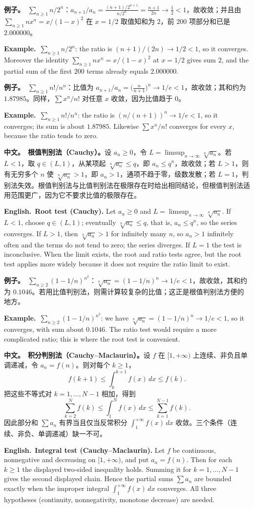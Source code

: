 \documentclass[UTF8,11pt,a4paper]{ctexart}
\newcommand{\BOTH}[2]{\par\noindent\textbf{中文。}\ #1\par\noindent\textbf{English.}\ #2\par}
\newcommand{\EX}[2]{\par\noindent\textbf{例子。}\ #1\par\noindent\textbf{Example.}\ #2\par}
\begin{document}
\EX{$\sum_{n\ge1}n/2^n$：$a_{n+1}/a_n=\frac{(n+1)/2^{n+1}}{n/2^n}=\frac{n+1}{2n}\to\frac12<1$，故收敛；并且由 $\sum_{n\ge1}nx^n=x/(1-x)^2$ 在 $x=1/2$ 取值知和为 $2$，前 $200$ 项部分和已是 $2.000000$。}{$\sum_{n\ge1}n/2^n$: the ratio is $(n+1)/(2n)\to1/2<1$, so it converges. Moreover the identity $\sum_{n\ge1}nx^n=x/(1-x)^2$ at $x=1/2$ gives sum $2$, and the partial sum of the first $200$ terms already equals $2.000000$.}
\EX{$\sum_{n\ge1}n!/n^n$：比值为 $a_{n+1}/a_n=\bigl(\frac{n}{n+1}\bigr)^n\to1/e<1$，故收敛；其和约为 $1.87985$。同样，$\sum x^n/n!$ 对任意 $x$ 收敛，因为比值趋于 $0$。}{$\sum_{n\ge1}n!/n^n$: the ratio is $(n/(n+1))^n\to1/e<1$, so it converges; its sum is about $1.87985$. Likewise $\sum x^n/n!$ converges for every $x$, because the ratio tends to zero.}
\BOTH{\textbf{根值判别法（Cauchy）。}设 $a_n\ge0$，令 $L=\limsup_{n\to\infty}\sqrt[n]{a_n}$。若 $L<1$，取 $q\in(L,1)$，从某项起 $\sqrt[n]{a_n}\le q$，即 $a_n\le q^n$，故收敛；若 $L>1$，则有无穷多个 $n$ 使 $\sqrt[n]{a_n}>1$，即 $a_n>1$，通项不趋于零，级数发散；若 $L=1$，判别法失效。根值判别法与比值判别法在极限存在时给出相同结论，但根值判别法适用范围更广，因为它不要求比值的极限存在。}{\textbf{Root test (Cauchy).} Let $a_n\ge0$ and $L=\limsup_{n\to\infty}\sqrt[n]{a_n}$. If $L<1$, choose $q\in(L,1)$; eventually $\sqrt[n]{a_n}\le q$, that is, $a_n\le q^n$, so the series converges. If $L>1$, then $\sqrt[n]{a_n}>1$ for infinitely many $n$, so $a_n>1$ infinitely often and the terms do not tend to zero; the series diverges. If $L=1$ the test is inconclusive. When the limit exists, the root and ratio tests agree, but the root test applies more widely because it does not require the ratio limit to exist.}
\EX{$\sum_{n\ge2}(1-1/n)^{n^2}$：$\sqrt[n]{a_n}=(1-1/n)^n\to1/e<1$，故收敛，其和约为 $0.1046$。若用比值判别法，则需计算较复杂的比值；这正是根值判别法方便的地方。}{$\sum_{n\ge2}(1-1/n)^{n^2}$: we have $\sqrt[n]{a_n}=(1-1/n)^n\to1/e<1$, so it converges, with sum about $0.1046$. The ratio test would require a more complicated ratio; this is where the root test is convenient.}
\BOTH{\textbf{积分判别法（Cauchy--Maclaurin）。}设 $f$ 在 $[1,+\infty)$ 上连续、非负且单调递减，令 $a_n=f(n)$。则对每个 $k\ge1$，
\[
f(k+1)\le\int_k^{k+1}f(x)\,dx\le f(k).
\]
把这些不等式对 $k=1,\dots,N-1$ 相加，得到
\[
\sum_{k=2}^{N}f(k)\le\int_1^{N}f(x)\,dx\le\sum_{k=1}^{N-1}f(k).
\]
因此部分和 $\sum a_n$ 有界当且仅当反常积分 $\int_1^{+\infty}f(x)\,dx$ 收敛。三个条件（连续、非负、单调递减）缺一不可。}{\textbf{Integral test (Cauchy--Maclaurin).} Let $f$ be continuous, nonnegative and decreasing on $[1,+\infty)$, and put $a_n=f(n)$. Then for each $k\ge1$ the displayed two-sided inequality holds. Summing it for $k=1,\dots,N-1$ gives the second displayed chain. Hence the partial sums $\sum a_n$ are bounded exactly when the improper integral $\int_1^{+\infty}f(x)\,dx$ converges. All three hypotheses (continuity, nonnegativity, monotone decrease) are needed.}
\end{document}
